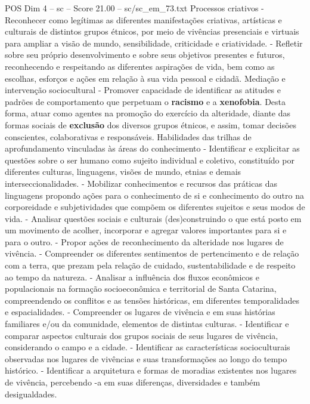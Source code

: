 \begin{textsample}{POS Dim 4 – sc – Score 21.00 – sc/sc\_em\_73.txt}
Processos criativos - Reconhecer como legítimas as diferentes manifestações criativas, artísticas e culturais de distintos grupos étnicos, por meio de vivências presenciais e virtuais para ampliar a visão de mundo, sensibilidade, criticidade e criatividade. - Refletir sobre seu próprio desenvolvimento e sobre seus objetivos presentes e futuros, reconhecendo e respeitando as diferentes aspirações de vida, bem como as escolhas, esforços e ações em relação à sua vida pessoal e cidadã.
Mediação e intervenção sociocultural - Promover capacidade de identificar as atitudes e padrões de comportamento que perpetuam o \textbf{racismo} e a \textbf{xenofobia}.
Desta forma, atuar como agentes na promoção do exercício da alteridade, diante das formas sociais de \textbf{exclusão} dos diversos grupos étnicos, e assim, tomar decisões conscientes, colaborativas e responsáveis.
Habilidades das trilhas de aprofundamento vinculadas às áreas do conhecimento - Identificar e explicitar as questões sobre o ser humano como sujeito individual e coletivo, constituído por diferentes culturas, linguagens, visões de mundo, etnias e demais interseccionalidades. - Mobilizar conhecimentos e recursos das práticas das linguagens propondo ações para o conhecimento de si e conhecimento do outro na corporeidade e subjetividades que compõem os diferentes sujeitos e seus modos de vida. - Analisar questões sociais e culturais (des)construindo o que está posto em um movimento de acolher, incorporar e agregar valores importantes para si e para o outro. - Propor ações de reconhecimento da alteridade nos lugares de vivência. - Compreender os diferentes sentimentos de pertencimento e de relação com a terra, que prezam pela relação de cuidado, sustentabilidade e de respeito ao tempo da natureza. - Analisar a influência dos fluxos econômicos e populacionais na formação socioeconômica e territorial de Santa Catarina, compreendendo os conflitos e as tensões históricas, em diferentes temporalidades e espacialidades. - Compreender os lugares de vivência e em suas histórias familiares e/ou da comunidade, elementos de distintas culturas. - Identificar e comparar aspectos culturais dos grupos sociais de seus lugares de vivência, considerando o campo e a cidade. - Identificar as características socioculturais observadas nos lugares de vivências e suas transformações ao longo do tempo histórico. - Identificar a arquitetura e formas de moradias existentes nos lugares de vivência, percebendo -a em suas diferenças, diversidades e também desigualdades.

\end{textsample}
